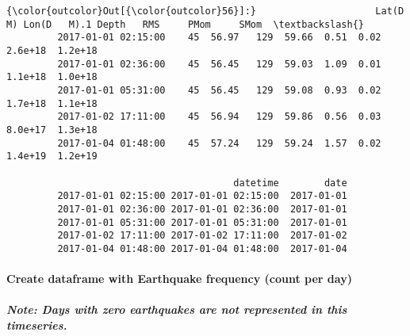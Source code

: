\documentclass[11pt]{article}
\begin{document}
\begin{Verbatim}[commandchars=\\\{\}]
{\color{outcolor}Out[{\color{outcolor}56}]:}                     Lat(D     M) Lon(D   M).1 Depth   RMS     PMom     SMom  \textbackslash{}
         2017-01-01 02:15:00    45  56.97   129  59.66  0.51  0.02  2.6e+18  1.2e+18   
         2017-01-01 02:36:00    45  56.45   129  59.03  1.09  0.01  1.1e+18  1.0e+18   
         2017-01-01 05:31:00    45  56.45   129  59.08  0.93  0.02  1.7e+18  1.1e+18   
         2017-01-02 17:11:00    45  56.94   129  59.86  0.56  0.03  8.0e+17  1.3e+18   
         2017-01-04 01:48:00    45  57.24   129  59.24  1.57  0.02  1.4e+19  1.2e+19   
         
                                        datetime        date  
         2017-01-01 02:15:00 2017-01-01 02:15:00  2017-01-01  
         2017-01-01 02:36:00 2017-01-01 02:36:00  2017-01-01  
         2017-01-01 05:31:00 2017-01-01 05:31:00  2017-01-01  
         2017-01-02 17:11:00 2017-01-02 17:11:00  2017-01-02  
         2017-01-04 01:48:00 2017-01-04 01:48:00  2017-01-04  
\end{Verbatim}
            
    \hypertarget{create-dataframe-with-earthquake-frequency-count-per-day}{%
\paragraph{Create dataframe with Earthquake frequency (count per
day)}\label{create-dataframe-with-earthquake-frequency-count-per-day}}

\hypertarget{note-days-with-zero-earthquakes-are-not-represented-in-this-timeseries.}{%
\subparagraph{Note: Days with zero earthquakes are not represented in
this
timeseries.}\label{note-days-with-zero-earthquakes-are-not-represented-in-this-timeseries.}}
\end{document}

